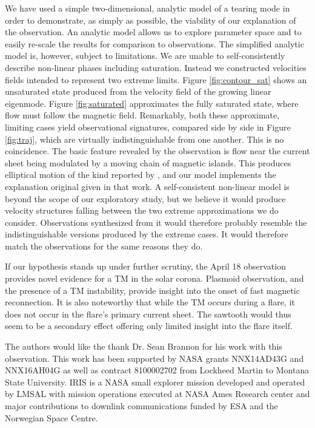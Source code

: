 We have used a simple two-dimensional, analytic model of a tearing mode in order to demonstrate, as simply as possible, the viability of our explanation of the observation.  An analytic model allows us to explore parameter space and to easily re-scale the results for comparison to observations.  The simplified  analytic model is, however, subject to limitations.  We are unable to self-consistently describe non-linear phases including saturation.  Instead we constructed velocities fields intended to represent two extreme limits.  Figure \ref{fig:contour_sat} shows an unsaturated state produced from the velocity field of the growing linear eigenmode.   Figure \ref{fig:saturated} approximates the fully saturated state, where flow must follow the magnetic field.  Remarkably, both these approximate, limiting cases yield observational signatures, compared side by side in Figure \ref{fig:traj}, which are virtually indistinguishable from one another.  This is no coincidence.  The basic feature revealed by the observation is flow near the current sheet being modulated by a moving chain of magnetic islands.  This produces elliptical motion of the kind reported by \BLQ, and our model implements the explanation original given in that work.  A self-consistent non-linear model is beyond the scope of our exploratory study, but we believe it would produce velocity structures falling between the two extreme approximations we do consider.  Observations synthesized from it would therefore probably resemble the indistinguishable versions produced by the extreme cases.  It would therefore match the observations for the same reasons they do.

If our hypothesis stands up under further scrutiny, the April 18 observation provides novel evidence for a TM in the solar corona. Plasmoid observation, and the presence of a TM instability, provide insight into the onset of fast magnetic reconnection.  It is also noteworthy that while the TM occurs during a flare, it does not occur in the flare's primary current sheet.  The sawtooth would thus seem to be a secondary effect offering only limited insight into the flare itself.


The authors would like the thank Dr. Sean Brannon for his work with this observation. This work has been supported by NASA grants NNX14AD43G and NNX16AH04G as well as contract 8100002702 from Lockheed Martin to Montana State University.  IRIS is a NASA small explorer mission developed and operated by LMSAL with mission operations executed at NASA Ames Research center and major contributions to downlink communications funded by ESA and the Norwegian Space Centre.    








